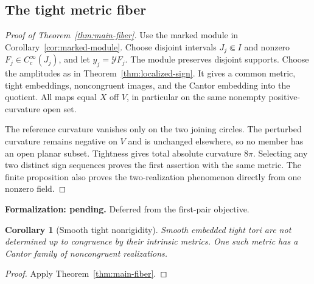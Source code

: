 \documentclass[11pt]{amsart}
\newtheorem{corollary}[theorem]{Corollary}
\theoremstyle{definition}
\theoremstyle{remark}
\numberwithin{equation}{section}
\begin{document}
\subsection{The tight metric fiber}\label{sec:tight-main}
\begin{proof}[Proof of Theorem~\ref{thm:main-fiber}]
Use the marked module in Corollary~\ref{cor:marked-module}. Choose disjoint
intervals $J_j\Subset I$ and nonzero $F_j\in C_c^\infty(J_j)$, and let
$y_j=\mathcal YF_j$. The module preserves disjoint supports. Choose the
amplitudes as in Theorem~\ref{thm:localized-sign}. It gives a common metric,
tight embeddings, noncongruent images, and the Cantor embedding into the
quotient. All maps equal $X$ off $V$, in particular on the same nonempty
positive-curvature open set.

The reference curvature vanishes only on the two joining circles.
The perturbed curvature remains negative on $V$ and is unchanged elsewhere,
so no member has an open planar subset. Tightness gives total absolute
curvature $8\pi$. Selecting any two distinct sign sequences proves the
first assertion with the same metric. The finite proposition also proves
the two-realization phenomenon directly from one nonzero field.
\end{proof}

\par\noindent\textbf{Formalization: pending.} Deferred from the first-pair objective.\par
\begin{corollary}[Smooth tight nonrigidity]\label{cor:tight-nonrigidity}
Smooth embedded tight tori are not determined up to congruence by their
intrinsic metrics. One such metric has a Cantor family of noncongruent
realizations.
\end{corollary}
\begin{proof}
Apply Theorem~\ref{thm:main-fiber}.
\end{proof}
\end{document}

